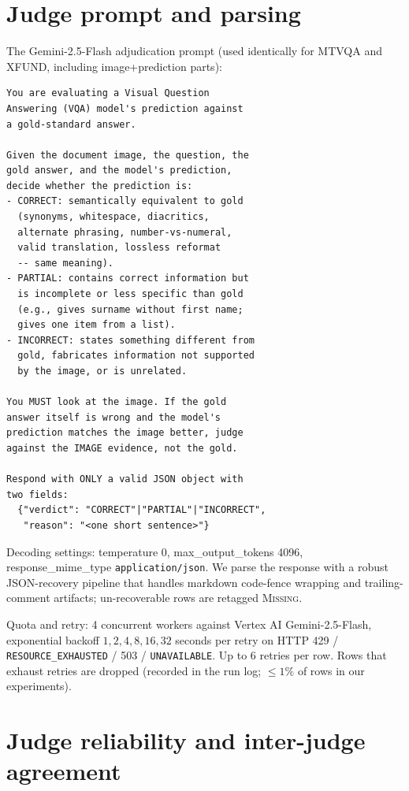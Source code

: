 \section{Judge prompt and parsing}
\label{app:judge-prompt}

The Gemini-2.5-Flash adjudication prompt (used identically for MTVQA and XFUND, including image+prediction parts):

{\scriptsize
\begin{verbatim}
You are evaluating a Visual Question
Answering (VQA) model's prediction against
a gold-standard answer.

Given the document image, the question, the
gold answer, and the model's prediction,
decide whether the prediction is:
- CORRECT: semantically equivalent to gold
  (synonyms, whitespace, diacritics,
  alternate phrasing, number-vs-numeral,
  valid translation, lossless reformat
  -- same meaning).
- PARTIAL: contains correct information but
  is incomplete or less specific than gold
  (e.g., gives surname without first name;
  gives one item from a list).
- INCORRECT: states something different from
  gold, fabricates information not supported
  by the image, or is unrelated.

You MUST look at the image. If the gold
answer itself is wrong and the model's
prediction matches the image better, judge
against the IMAGE evidence, not the gold.

Respond with ONLY a valid JSON object with
two fields:
  {"verdict": "CORRECT"|"PARTIAL"|"INCORRECT",
   "reason": "<one short sentence>"}
\end{verbatim}
}

Decoding settings: temperature 0, max\_output\_tokens 4096, response\_mime\_type \texttt{application/json}. We parse the response with a robust JSON-recovery pipeline that handles markdown code-fence wrapping and trailing-comment artifacts; un-recoverable rows are retagged \textsc{Missing}.

Quota and retry: 4 concurrent workers against Vertex AI Gemini-2.5-Flash, exponential backoff $1, 2, 4, 8, 16, 32$ seconds per retry on HTTP 429 / \texttt{RESOURCE\_EXHAUSTED} / 503 / \texttt{UNAVAILABLE}. Up to 6 retries per row. Rows that exhaust retries are dropped (recorded in the run log; $\leq 1\%$ of rows in our experiments).

\section{Judge reliability and inter-judge agreement}
\label{app:judge-reliability}

